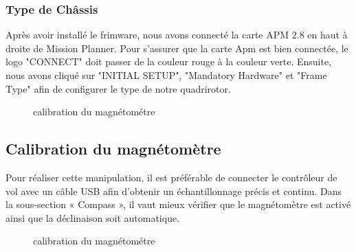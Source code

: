 	\subsubsection{Type de Châssis}
	Après avoir installé le frimware, nous avons connecté  la carte APM 2.8 en haut à droite de Mission Planner. Pour s'assurer que la carte Apm est bien connectée, le logo "CONNECT" doit passer de la couleur rouge à la couleur verte. Ensuite, nous avons cliqué sur "INITIAL SETUP", "Mandatory Hardware" et "Frame Type" afin de  configurer le type de notre quadrirotor. 
	\begin{figure}[h]
		\begin{center}
			\centering
		\end{center}
		\caption{calibration du magnétométre}
	\end{figure}
	\subsection{Calibration du magnétomètre}
	Pour réaliser cette manipulation, il est préférable de connecter le contrôleur de vol avec un câble USB afin d’obtenir un échantillonnage précis et continu.
	Dans la sous-section « Compass », il vaut mieux vérifier que le magnétomètre est activé ainsi que la déclinaison soit automatique.
	
	\begin{figure}[h]
		\begin{center}
			\centering
		\end{center}
		\caption{calibration du magnétométre}
	\end{figure}
	
